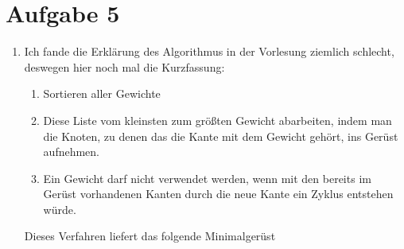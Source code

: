 \documentclass{article}
\begin{document}
	\section*{Aufgabe 5}
	\begin{enumerate}[label=(\alph*)]
		\item Ich fande die Erklärung des Algorithmus in der Vorlesung ziemlich schlecht, deswegen hier noch mal die Kurzfassung:
		\begin{enumerate}[label=\arabic*.]
			\item Sortieren aller Gewichte
			\item Diese Liste vom kleinsten zum größten Gewicht abarbeiten, indem man die Knoten, zu denen das die Kante mit dem Gewicht gehört, ins Gerüst aufnehmen.
			\item Ein Gewicht darf nicht verwendet werden, wenn mit den bereits im Gerüst vorhandenen Kanten durch die neue Kante ein Zyklus entstehen würde.
		\end{enumerate}
		Dieses Verfahren liefert das folgende Minimalgerüst
		\begin{center}
\end{center}
\end{enumerate}
\end{document}
